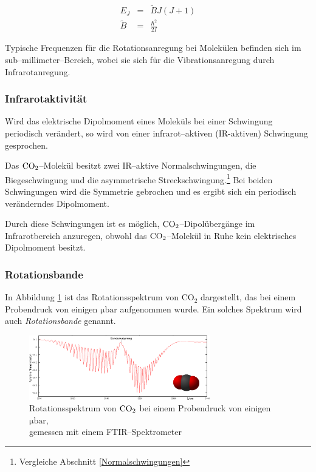 \documentclass[12pt,a4paper]{scrartcl}
\numberwithin{equation}{section} %
\begin{document}
\begin{eqnarray}
	E_J &=& \tilde{B} J (J + 1) \\
	\tilde{B} &=& \frac{\hbar^2}{2 I}
\end{eqnarray}

\noindent
Typische Frequenzen für die Rotationsanregung bei Molekülen befinden sich im sub--millimeter--Bereich, wobei sie sich für die Vibrationsanregung durch Infrarotanregung. %

\hypertarget{infrarotaktivituxe4t}{\subsubsection{Infrarotaktivität}\label{infrarotaktivituxe4t}}
Wird das elektrische Dipolmoment eines Moleküls bei einer Schwingung periodisch verändert, so wird von einer infrarot--aktiven (IR-aktiven) Schwingung gesprochen.

Das $\ce{CO_2}$--Molekül besitzt zwei  IR--aktive Normalschwingungen, die Biegeschwingung und die asymmetrische Streckschwingung.\footnote{Vergleiche Abschnitt \ref{Normalschwingungen}} Bei beiden Schwingungen wird die Symmetrie gebrochen und es ergibt sich ein periodisch veränderndes Dipolmoment.

Durch diese Schwingungen ist es möglich, $\ce{CO_2}$--Dipolübergänge im Infrarotbereich anzuregen, obwohl das $\ce{CO_2}$--Molekül  in Ruhe kein elektrisches Dipolmoment besitzt. \cite{HakenWolf} %

\hypertarget{Rotationsbande}{\subsubsection{Rotationsbande}\label{Rotationsbande}}
In Abbildung \ref{fig:rotationsspektrumCO2} ist das Rotationsspektrum von CO$_2$ dargestellt, das bei einem Probendruck von einigen $\mathrm{\mu bar}$ aufgenommen wurde. Ein solches Spektrum wird auch \emph{Rotationsbande} genannt.

\begin{figure}[h]
	\centering
	\includegraphics[width=0.7\textwidth]{../media/B1.1/Rotationssprektrum_CO2.png}
	\caption{Rotationsspektrum von $\ce{CO_2}$ bei einem Probendruck von einigen $\mathrm{\mu bar}$,\\
		gemessen mit einem FTIR--Spektrometer \cite{UzK}}
	\label{fig:rotationsspektrumCO2}
\end{figure}
\end{document}
